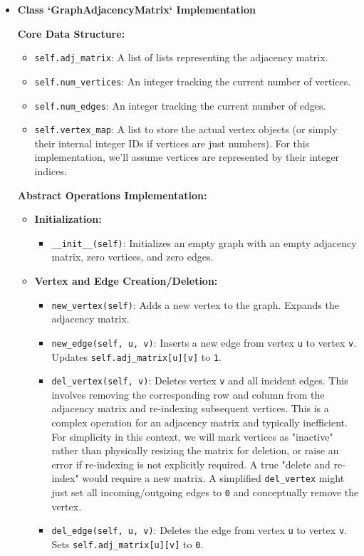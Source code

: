 \documentclass{article}
\begin{document}
\begin{itemize}
    \item \textbf{Class `GraphAdjacencyMatrix` Implementation}

    \textbf{Core Data Structure:}
    \begin{itemize}
        \item \texttt{self.adj\_matrix}: A list of lists representing the adjacency matrix.
        \item \texttt{self.num\_vertices}: An integer tracking the current number of vertices.
        \item \texttt{self.num\_edges}: An integer tracking the current number of edges.
        \item \texttt{self.vertex\_map}: A list to store the actual vertex objects (or simply their internal integer IDs if vertices are just numbers). For this implementation, we'll assume vertices are represented by their integer indices.
    \end{itemize}

    \textbf{Abstract Operations Implementation:}

    \begin{itemize}
        \item \textbf{Initialization:}
        \begin{itemize}
            \item \texttt{\_\_init\_\_(self)}: Initializes an empty graph with an empty adjacency matrix, zero vertices, and zero edges.
        \end{itemize}
        
        \item \textbf{Vertex and Edge Creation/Deletion:}
        \begin{itemize}
            \item \texttt{new\_vertex(self)}: Adds a new vertex to the graph. Expands the adjacency matrix.
            \item \texttt{new\_edge(self, u, v)}: Inserts a new edge from vertex \texttt{u} to vertex \texttt{v}. Updates \texttt{self.adj\_matrix[u][v]} to \texttt{1}.
            \item \texttt{del\_vertex(self, v)}: Deletes vertex \texttt{v} and all incident edges. This involves removing the corresponding row and column from the adjacency matrix and re-indexing subsequent vertices. This is a complex operation for an adjacency matrix and typically inefficient. For simplicity in this context, we will mark vertices as "inactive" rather than physically resizing the matrix for deletion, or raise an error if re-indexing is not explicitly required. A true "delete and re-index" would require a new matrix. A simplified \texttt{del\_vertex} might just set all incoming/outgoing edges to \texttt{0} and conceptually remove the vertex.
            \item \texttt{del\_edge(self, u, v)}: Deletes the edge from vertex \texttt{u} to vertex \texttt{v}. Sets \texttt{self.adj\_matrix[u][v]} to \texttt{0}.
        \end{itemize}


\end{itemize}
\end{itemize}
\end{document}

